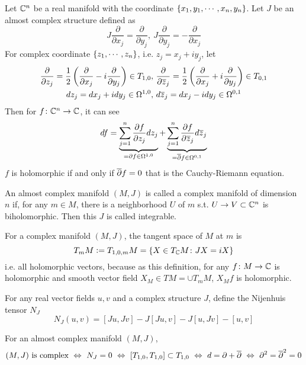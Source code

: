 \documentclass[a4paper,12pt]{article}
\begin{document}
	\begin{exam}
		Let $\mathbb{C}^n$ be a real manifold with the coordinate $\left\{x_1,y_1,\cdots,x_n,y_n\right\}$. Let $J$ be an almost complex structure defined as
		\begin{equation*}
			J \frac{\partial}{\partial x_j} = \frac{\partial}{\partial y_j},~J \frac{\partial}{\partial y_j} = -\frac{\partial}{\partial x_j}
		\end{equation*}
		For complex coordinate $\left\{z_1,\cdots,z_n\right\}$, i.e. $z_j = x_j+iy_j$, let
		\begin{equation*}
			\begin{split}
				\frac{\partial}{\partial z_j} = \frac{1}{2} \left(\frac{\partial}{\partial x_j} - i\frac{\partial}{\partial y_j}\right) \in T_{1,0},~&\frac{\partial}{\partial \overline{z}_j} = \frac{1}{2} \left(\frac{\partial}{\partial x_j} + i\frac{\partial}{\partial y_j}\right) \in T_{0,1} \\
				dz_j = dx_j + idy_j \in \Omega^{1,0},~&d\overline{z}_j = dx_j - i dy_j \in \Omega^{0,1}
			\end{split}
		\end{equation*}
		Then for $f \colon \mathbb{C}^n \rightarrow \mathbb{C}$, it can see
		\begin{equation*}
			df = \underbrace{\sum_{j=1}^n \frac{\partial f}{\partial z_j} dz_j}_{=\partial f \in \Omega^{1,0}} +  \underbrace{\sum_{j=1}^n \frac{\partial f}{\partial \overline{z}_j} d\overline{z}_j}_{=\overline{\partial} f \in \Omega^{0,1}}
		\end{equation*}
		$f$ is holomorphic if and only if $\overline{\partial} f = 0$ that is the Cauchy-Riemann equation.
	\end{exam}
	\begin{defn}
		An almost complex manifold $(M,J)$ is called a complex manifold of dimension $n$ if, for any $m \in M$, there is a neighborhood $U$ of $m$ s.t. $U \rightarrow V \subset \mathbb{C}^n$ is biholomorphic. Then this $J$ is called integrable.
	\end{defn}
	\begin{rem}
		For a complex manifold $(M,J)$, the tangent space of $M$ at $m$ is
		\begin{equation*}
			T_{m}M \vcentcolon= T_{1,0,m}M = \left\{X  \in T_{\mathbb{C}}M \colon JX = iX\right\}
		\end{equation*}
		i.e. all holomorphic vectors, because as this definition, for any $f \colon M \rightarrow \mathbb{C}$ is holomorphic and smooth vector field $X_M \in TM = \cup T_mM$,  $X_Mf$ is holomorphic.
	\end{rem}
	For any real vector fields $u,v$ and a complex structure $J$, define the Nijenhuis tensor $N_J$
	\begin{equation*}
		N_J(u,v) = [Ju,Jv] - J[Ju,v] - J[u,Jv] - [u,v]
	\end{equation*}
	\begin{thm}
		For an almost complex manifold $(M,J)$,
		\begin{equation*}
			(M,J) \text{ is complex}~\Leftrightarrow~ N_J = 0 ~\Leftrightarrow~ [T_{1,0},T_{1,0}] \subset T_{1,0} ~\Leftrightarrow~ d = \partial + \overline{\partial}~\Leftrightarrow~ \partial^2 = \overline{\partial}^2 = 0
		\end{equation*}
	\end{thm}
	
\end{document}
